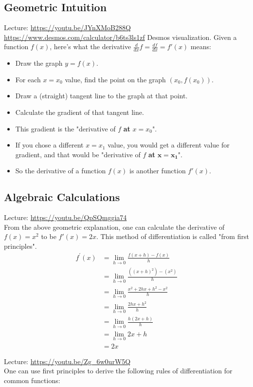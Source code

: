 \documentclass{article}
\begin{document}
\subsection{Geometric Intuition}
Lecture: \url{https://youtu.be/JYnXMoB288Q} \\[10pt]
\url{https://www.desmos.com/calculator/b6ts3ls1zf} Desmos visualization. Given a function $f(x)$, here's what the derivative $\frac{d}{dx}f = \frac{df}{dx} = f'(x)$ means:
\begin{itemize}
    \item Draw the graph $y=f(x)$.
    \item For each $x = x_0$ value, find the point on the graph $(x_0,f(x_0))$.
    \item Draw a (straight) tangent line to the graph at that point.
    \item Calculate the gradient of that tangent line.
    \item This gradient is the "derivative of $f$ \textbf{at }$x=x_0$".
    \item If you chose a different $x=x_1$ value, you would get a different value for gradient, and that would be "derivative of $f$ \textbf{at }$\mathbf{x=x_1}$".
    \item So the derivative of a function $f(x)$ is another function $f'(x)$.
\end{itemize}
\subsection{Algebraic Calculations}
Lecture: \url{https://youtu.be/QpSQmggia74} \\[10pt]
From the above geometric explanation, one can calculate the derivative of $f(x) = x^2$ to be $f'(x) = 2x$. This method of differentiation is called "from first principles".
\begin{align*}
f^{\prime}(x) & =\lim _{h \rightarrow 0} \frac{f(x+h)-f(x)}{h} \\
& =\lim _{h \rightarrow 0} \frac{\left((x+h)^2\right)-\left(x^2\right)}{h} \\
& =\lim _{h \rightarrow 0} \frac{x^2+2 h x+h^2-x^2}{h} \\
& =\lim _{h \rightarrow 0} \frac{2 h x+h^2}{h} \\
& =\lim _{h \rightarrow 0} \frac{h(2 x+h)}{h} \\
& =\lim _{h \rightarrow 0} 2 x+h \\
& =2 x
\end{align*}

Lecture: \url{https://youtu.be/Zg_6w0urW5Q} \\[10pt]
One can use first principles to derive the following rules of differentiation for common functions:
\end{document}
